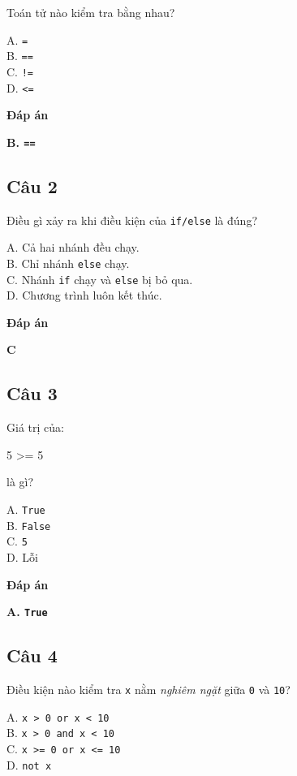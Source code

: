\documentclass[
  11pt,
  a4paper,
]{article}
\newenvironment{Shaded}{}{}
\newcommand{\DecValTok}[1]{\textcolor[rgb]{0.25,0.63,0.44}{#1}}
\newcommand{\OperatorTok}[1]{\textcolor[rgb]{0.40,0.40,0.40}{#1}}
\begin{document}
Toán tử nào kiểm tra bằng nhau?

A. \texttt{=}\\
B. \texttt{==}\\
C. \texttt{!=}\\
D. \texttt{\textless{}=}

\textbf{Đáp án}

\textbf{B. \texttt{==}}

\subsection{Câu 2}\label{cuxe2u-2-8}

Điều gì xảy ra khi điều kiện của \texttt{if/else} là đúng?

A. Cả hai nhánh đều chạy.\\
B. Chỉ nhánh \texttt{else} chạy.\\
C. Nhánh \texttt{if} chạy và \texttt{else} bị bỏ qua.\\
D. Chương trình luôn kết thúc.

\textbf{Đáp án}

\textbf{C}

\subsection{Câu 3}\label{cuxe2u-3-5}

Giá trị của:

\begin{Shaded}
\begin{Highlighting}[]
\DecValTok{5} \OperatorTok{\textgreater{}=} \DecValTok{5}
\end{Highlighting}
\end{Shaded}

là gì?

A. \texttt{True}\\
B. \texttt{False}\\
C. \texttt{5}\\
D. Lỗi

\textbf{Đáp án}

\textbf{A. \texttt{True}}

\subsection{Câu 4}\label{cuxe2u-4-3}

Điều kiện nào kiểm tra \texttt{x} nằm \emph{nghiêm ngặt} giữa \texttt{0}
và \texttt{10}?

A. \texttt{x\ \textgreater{}\ 0\ or\ x\ \textless{}\ 10}\\
B. \texttt{x\ \textgreater{}\ 0\ and\ x\ \textless{}\ 10}\\
C. \texttt{x\ \textgreater{}=\ 0\ or\ x\ \textless{}=\ 10}\\
D. \texttt{not\ x}
\end{document}
